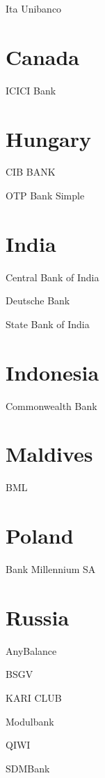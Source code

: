 \documentclass[a4paper,10pt,english]{sphinxmanual}
\begin{document}
\sphinxAtStartPar
Ita Unibanco


\section{Canada}
\label{\detokenize{banks:canada}}
\sphinxAtStartPar
ICICI Bank


\section{Hungary}
\label{\detokenize{banks:hungary}}
\sphinxAtStartPar
CIB BANK

\sphinxAtStartPar
OTP Bank  Simple


\section{India}
\label{\detokenize{banks:india}}
\sphinxAtStartPar
Central Bank of India

\sphinxAtStartPar
Deutsche Bank

\sphinxAtStartPar
State Bank of India


\section{Indonesia}
\label{\detokenize{banks:indonesia}}
\sphinxAtStartPar
Commonwealth Bank


\section{Maldives}
\label{\detokenize{banks:maldives}}
\sphinxAtStartPar
BML


\section{Poland}
\label{\detokenize{banks:poland}}
\sphinxAtStartPar
Bank Millennium SA


\section{Russia}
\label{\detokenize{banks:russia}}
\sphinxAtStartPar
AnyBalance

\sphinxAtStartPar
BSGV

\sphinxAtStartPar
KARI CLUB

\sphinxAtStartPar
Modulbank

\sphinxAtStartPar
QIWI

\sphinxAtStartPar
SDMBank
\end{document}
